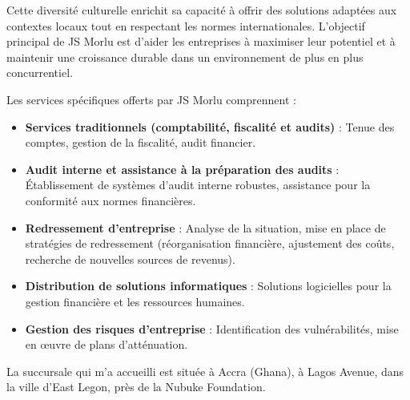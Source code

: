 {\vspace{0.5cm}

Cette diversité culturelle enrichit sa capacité à offrir des solutions adaptées aux contextes locaux tout en respectant les normes internationales. L'objectif principal de JS Morlu est d'aider les entreprises à maximiser leur potentiel et à maintenir une croissance durable dans un environnement de plus en plus concurrentiel.

\vspace{0.5cm}

Les services spécifiques offerts par JS Morlu comprennent :

\vspace{0.3cm}

\begin{itemize}
    \item \textbf{Services traditionnels (comptabilité, fiscalité et audits)} : Tenue des comptes, gestion de la fiscalité, audit financier.

\vspace{0.3cm}

\item \textbf{Audit interne et assistance à la préparation des audits} :
Établissement de systèmes d'audit interne robustes, assistance pour la conformité aux normes financières.

\vspace{0.3cm}

\item \textbf{Redressement d'entreprise} :
Analyse de la situation, mise en place de stratégies de redressement (réorganisation financière, ajustement des coûts, recherche de nouvelles sources de revenus).

\vspace{0.3cm}

\item \textbf{Distribution de solutions informatiques} :
Solutions logicielles pour la gestion financière et les ressources humaines.

\vspace{0.3cm}

\item \textbf{Gestion des risques d'entreprise} :
Identification des vulnérabilités, mise en œuvre de plans d'atténuation.

\end{itemize}

\vspace{0.5cm}

La succursale qui m'a accueilli est située à Accra (Ghana), à Lagos Avenue, dans la ville d'East Legon, près de la Nubuke Foundation. 

}
